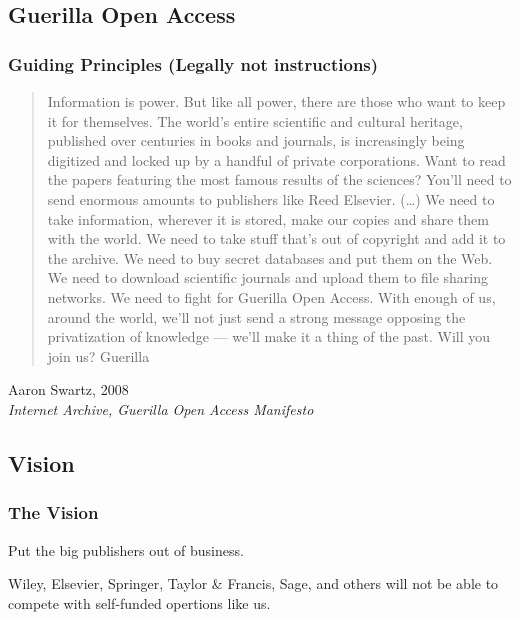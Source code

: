 \documentclass[aspectratio=169,9pt,xcolor=dvipsnames]{beamer}
\begin{document}
\subsection{Guerilla Open Access}
\begin{frame}
    \frametitle{Guiding Principles (Legally not instructions)}
\begin{quotation}
    Information is power. But like all power, there are those who want to keep it for themselves. The world’s entire scientific and cultural heritage, published over centuries in books and journals, is increasingly being digitized and locked up by a handful of private corporations. Want to read the papers featuring the most famous results of the sciences? You’ll need to send enormous amounts to publishers like Reed Elsevier.
(…)
We need to take information, wherever it is stored, make our copies and share them with the world. We need to take stuff that’s out of copyright and add it to the archive. We need to buy secret databases and put them on the Web. We need to download scientific journals and upload them to file sharing networks. We need to fight for Guerilla Open Access.
With enough of us, around the world, we’ll not just send a strong message opposing the privatization of knowledge — we’ll make it a thing of the past. Will you join us?
Guerilla
\end{quotation}
\begin{flushright}
    Aaron Swartz, 2008
    \\ \textit{Internet Archive, Guerilla Open Access Manifesto}
\end{flushright}
\end{frame}
\subsection{Vision}
\begin{frame}
    \frametitle{The Vision}
    \begin{center}
        \huge{Put the big publishers out of business.}
    \end{center}
    \begin{center}
        \small{Wiley, Elsevier, Springer, Taylor \& Francis, Sage, and others will not be able to compete with self-funded opertions like us.}
    \end{center}
\end{frame}
\end{document}
